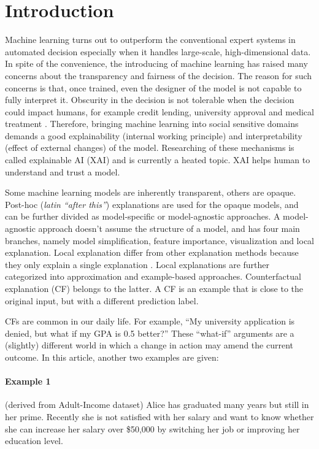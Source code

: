 \section{Introduction}
Machine learning turns out to outperform the conventional expert systems in automated decision especially when it handles large-scale, high-dimensional data. In spite of the convenience, the introducing of machine learning has raised many concerns about the transparency and fairness of the decision. The reason for such concerns is that, once trained, even the designer of the model is not capable to fully interpret it. Obscurity in the decision is not tolerable when the decision could impact humans, for example credit lending, university approval and medical treatment \cite{CFReview}. Therefore, bringing machine learning into social sensitive domains demands a good explainability (internal working principle) and interpretability (effect of external changes) of the model. %
Researching of these mechanisms is called explainable AI (XAI) and is currently a heated topic. XAI helps human to understand and trust a model.

Some machine learning models are inherently transparent, others are opaque. Post-hoc (\emph{latin ``after this''}) explanations are used for the opaque models, and can be further divided as model-specific or model-agnostic approaches. A model-agnostic approach doesn't assume the structure of a model, and has four main branches, namely model simplification, feature importance, visualization and local explanation. Local explanation differ from other explanation methods because they only explain a single explanation \cite{CFReview}. Local explanations are further categorized into approximation and example-based approaches. Counterfactual explanation (CF) belongs to the latter. A CF is an example that is close to the original input, but with a different prediction label.

CFs are common in our daily life. For example, ``My university application is denied, but what if my GPA is 0.5 better?'' These ``what-if'' arguments are a (slightly) different world in which a change in action may amend the current outcome. In this article, another two examples are given:
\paragraph{Example 1} \label{a}(derived from Adult-Income dataset) Alice has graduated many years but still in her prime. Recently she is not satisfied with her salary and want to know whether she can increase her salary over \$50,000 by switching her job or improving her education level.
